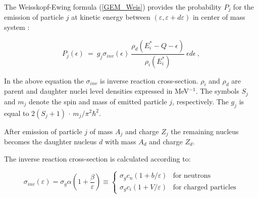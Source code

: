 The Weisskopf-Ewing formula (\ref{GEM_Weis}) 
provides the probability $P_j$ for the
emission of particle $j$ at kinetic energy between $(\varepsilon , \varepsilon +d\varepsilon)$ in center of mass system \cite{Weisskopf1937,Weisskopf1940}:

\begin{equation}
\label{GEM_Weis}
P_{j}(\epsilon) \ = \ g_{j} \sigma_{inv}(\epsilon) \ \frac{\rho_{d}(E_{i}^{*} - Q 
- \epsilon)}{\rho_{i}(E_{i}^{*})} \  \epsilon d\epsilon \ ,
\end{equation}





In the above equation the  $\sigma_{inv}$ is inverse reaction cross-section. $\rho_i$ and $\rho_d$ are parent and daughter nuclei level densities expressed in MeV$^{-1}$. The symbols $S_j$ and $m_j$ denote the spin and mass of emitted particle $j$, respectively. The $g_j$ is equal to $2(S_j +1)$ $\cdot$  $m_{j}/\pi^{2}\hbar^{2}$. 

After emission of particle $j$ of mass $A_j$ and charge $Z_j$ the remaining nucleus becomes the daughter nucleus $d$  with mass $A_d$ and charge $Z_d$.

The inverse reaction cross-section is calculated according to:

\begin{equation}
\label{GEM_invS}
	\sigma_{inv}(\varepsilon)=\sigma_{g}\alpha(1+\frac{\beta}{\varepsilon})\equiv \begin{cases} \sigma_{g}c_{n}(1+b/\varepsilon) &  \text{for neutrons}\\ 
		\sigma_{g}c_{i}(1+V/\varepsilon) &  \text{for charged particles} \end{cases} 
\end{equation}


